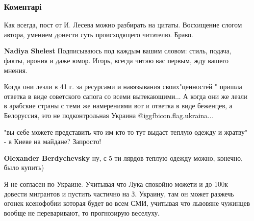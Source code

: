  
 
 
 
 
\subsubsection{Коментарі}

\begin{itemize} %

Как всегда, пост от И. Лесева можно разбирать на цитаты. Восхищение слогом
автора, умением донести суть происходящего читателю. Браво.

\begin{itemize} %
\textbf{Nadiya Shelest} Подписываюсь под каждым вашим словом: стиль, подача,
факты, ирония и даже юмор. Игорь, всегда читаю вас первым, жду вашего мнения.
\end{itemize} %


Когда они лезли в 41 г. за ресурсами и навязывания своих"ценностей " пришла
ответка в виде советского сапога со всеми вытекающими... А когда они же лезли в
арабские страны с теми же намерениями вот и ответка в виде беженцев, а
Белоруссия, это не подконтрольная Украина @igg{fbicon.flag.ukraina}...


"вы себе можете представить что им кто то тут выдаст теплую одежду и жратву" -
в Киеве на майдане? Запросто!

\begin{itemize} %
\textbf{Olexander Berdychevsky} ну, с 5-ти лярдов теплую одежду можно, конечно, было купить)
\end{itemize} %


Я не согласен по Украине. Учитывая что Лука спокойно можети и до 100к довести
мигрантов и пустить частично на З. Украину, там он может разжечь огонек
ксенофобии которая будет во всем СМИ, учитывая что львовяне чужинцев вообще не
переваривают, то прогнозирую веселуху.



\end{itemize}

